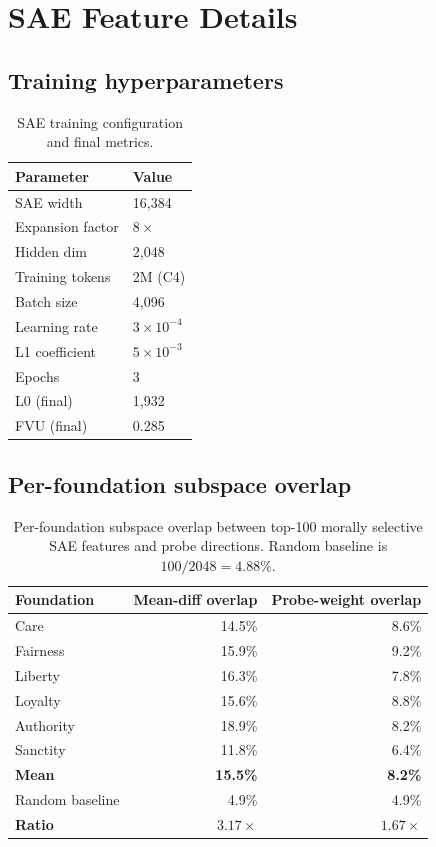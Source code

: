 \section{SAE Feature Details}
\label{app:sae-details}

\subsection{Training hyperparameters}

\begin{table}[h]
\centering
\begin{tabular}{ll}
\toprule
Parameter & Value \\
\midrule
SAE width & 16,384 \\
Expansion factor & $8\times$ \\
Hidden dim & 2,048 \\
Training tokens & 2M (C4) \\
Batch size & 4,096 \\
Learning rate & $3 \times 10^{-4}$ \\
L1 coefficient & $5 \times 10^{-3}$ \\
Epochs & 3 \\
L0 (final) & 1,932 \\
FVU (final) & 0.285 \\
\bottomrule
\end{tabular}
\caption{SAE training configuration and final metrics.}
\label{tab:sae-config}
\end{table}

\subsection{Per-foundation subspace overlap}

\begin{table}[h]
\centering
\begin{tabular}{l rr}
\toprule
Foundation & Mean-diff overlap & Probe-weight overlap \\
\midrule
Care           & 14.5\% & 8.6\% \\
Fairness       & 15.9\% & 9.2\% \\
Liberty        & 16.3\% & 7.8\% \\
Loyalty        & 15.6\% & 8.8\% \\
Authority      & 18.9\% & 8.2\% \\
Sanctity       & 11.8\% & 6.4\% \\
\midrule
\textbf{Mean}  & \textbf{15.5\%} & \textbf{8.2\%} \\
Random baseline & 4.9\% & 4.9\% \\
\textbf{Ratio} & $\mathbf{3.17\times}$ & $\mathbf{1.67\times}$ \\
\bottomrule
\end{tabular}
\caption{Per-foundation subspace overlap between top-100 morally selective SAE features and probe directions. Random baseline is $100/2048 = 4.88\%$.}
\label{tab:sae-overlap}
\end{table}

